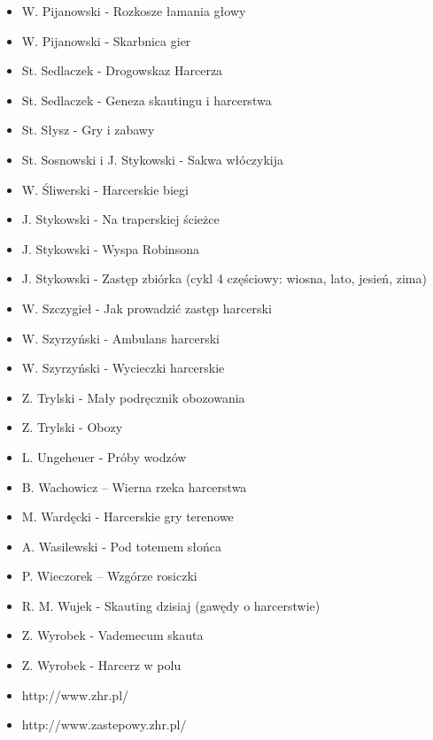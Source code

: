 \begin{multicols}{2}
\begin{itemize}[noitemsep,nolistsep]
\item	W. Pijanowski - Rozkosze łamania głowy
\item	W. Pijanowski - Skarbnica gier
\item	St. Sedlaczek - Drogowskaz Harcerza
\item	St. Sedlaczek - Geneza skautingu i harcerstwa
\item	St. Słysz - Gry i zabawy
\item	St. Sosnowski i J. Stykowski - Sakwa włóczykija
\item	W. Śliwerski - Harcerskie biegi
\item	J. Stykowski - Na traperskiej ścieżce
\item	J. Stykowski - Wyspa Robinsona
\item	J. Stykowski - Zastęp zbiórka (cykl 4 częściowy: wiosna, lato, jesień, zima)
\item	W. Szczygieł - Jak prowadzić zastęp harcerski
\item	W. Szyrzyński - Ambulans harcerski
\item	W. Szyrzyński - Wycieczki harcerskie
\item	Z. Trylski - Mały podręcznik obozowania
\item	Z. Trylski - Obozy 
\item	L. Ungeheuer - Próby wodzów
\item	B. Wachowicz – Wierna rzeka harcerstwa
\item	M. Wardęcki - Harcerskie gry terenowe
\item	A. Wasilewski - Pod totemem słońca
\item	P. Wieczorek – Wzgórze rosiczki
\item	R. M. Wujek - Skauting dzisiaj (gawędy o harcerstwie)
\item	Z. Wyrobek - Vademecum skauta
\item	Z. Wyrobek - Harcerz w polu
\item	http://www.zhr.pl/
\item	http://www.zastepowy.zhr.pl/
\end{itemize}
\end{multicols}
